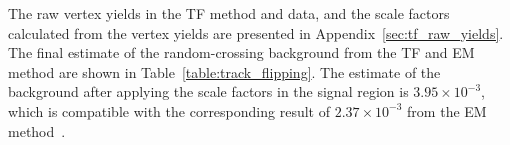 The raw vertex yields in the TF method and data, and the scale factors calculated from the vertex yields are presented in Appendix~\ref{sec:tf_raw_yields}. The final estimate of the random-crossing background from the TF and EM method are shown in Table~\ref{table:track_flipping}. The estimate of the background after applying the scale factors in the signal region is $3.95\times10^{-3}$, which is compatible with the corresponding result of $2.37\times 10^{-3}$ from the EM method~\cite{DuarteCampderros:2275055}.


\begin{table}[!htb]%
  \centering
  \caption{The estimate of the random-crossing background in the signal region from the TF and EM methods. In the TF, the scale factors (Table~\ref{table:tf_raw_yields}) are applied to obtain the corrected estimate of the background.}%
  \label{table:track_flipping}
\end{table}




